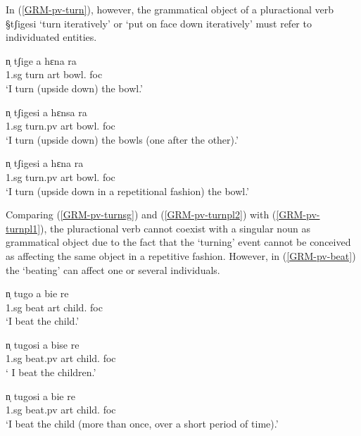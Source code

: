  In (\ref{GRM-pv-turn}), however,  the grammatical object of a
pluractional verb {\S tʃigesi} `turn iteratively' or `put on face
down iteratively'  must refer to individuated entities. 

\begin{exe}
\ex\label{GRM-pv-turn}
  \begin{xlist}
    \ex\label{GRM-pv-turnsg}
\gll   n̩  tʃige  a  hɛna  ra  \\
        {\sc 1.sg} {turn} {\sc art} {bowl.\sg} {\sc foc}\\
\glt `I turn (upside down) the bowl.'

 \ex\label{GRM-pv-turnpl1}
\gll   n̩  tʃigesi  a  hɛnsa  ra   \\
         {\sc 1.sg}   {turn.{\sc pv}} {\sc art} {bowl.\pl} {\sc foc}\\
\glt `I turn (upside down) the bowls (one after the other).'


 \ex\label{GRM-pv-turnpl2}
\gll {\textasteriskcentered}  n̩  tʃigesi   a  hɛna  ra \\
       {}  {\sc 1.sg}    {turn.{\sc pv}} {\sc art}  {bowl.\sg}  {\sc foc}\\
\glt `I turn (upside down in a repetitional fashion) the bowl.'

 \end{xlist}
\end{exe}

Comparing  (\ref{GRM-pv-turnsg}) and (\ref{GRM-pv-turnpl2}) with 
(\ref{GRM-pv-turnpl1}),   the pluractional verb cannot coexist with a singular
noun as grammatical object due to the fact that  the `turning' event cannot be
conceived as affecting the same object in a repetitive fashion. However, in
(\ref{GRM-pv-beat}) the `beating' can affect  one or several
individuals. 


\begin{exe}
\ex\label{GRM-pv-beat}
  \begin{xlist}
    \ex\label{GRM-pv-beat.sg}
\gll   n̩   tugo  a bie  re  \\
            {\sc 1.sg}  {beat} {\sc art} {child.\sg} {\sc foc}\\
\glt `I beat the child.'

\ex\label{GRM-pv-beat.pl1}
\gll   n̩    tugosi  a bise  re   \\
         {\sc 1.sg}   {beat.{\sc pv}} {\sc art} {child.\pl} {\sc foc}\\
\glt ` I beat the children.'


\ex\label{GRM-pv-beat.pl2}
\gll    n̩    tugosi  a  bie  re   \\
         {\sc 1.sg}    {beat.{\sc pv}} {\sc art}  {child.\sg} {\sc foc} \\
\glt `I beat the child (more than once, over a short period of time).'


 \end{xlist}
\end{exe}

